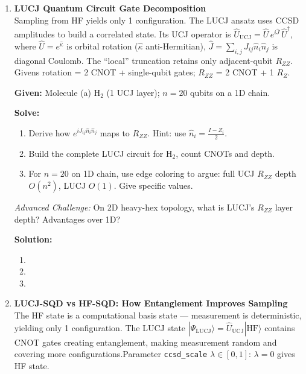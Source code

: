 \documentclass[fontset=mac]{ctexart}
\newcommand{\ket}[1]{|#1\rangle}
\begin{document}
\begin{enumerate}
    \emph{Advanced Challenge:} Formulate as Bayesian inference --- $\bar{n}_i$ as prior, observed bitstring as likelihood, find MAP configuration. How does this relate to (b)?

    \textbf{Solution:}
    \begin{enumerate}[label=(\alph*)]
        \item
        \item
        \item
    \end{enumerate}

    \item \textbf{LUCJ Quantum Circuit Gate Decomposition} \\ Sampling from HF yields only 1 configuration. The LUCJ ansatz uses CCSD amplitudes to build a correlated state. Its UCJ operator is $\hat{U}_{\text{UCJ}} = \hat{U}\, e^{i\hat{J}}\, \hat{U}^\dagger$, where $\hat{U} = e^{\hat{\kappa}}$ is orbital rotation ($\hat{\kappa}$ anti-Hermitian), $\hat{J} = \sum_{i,j} J_{ij}\hat{n}_i\hat{n}_j$ is diagonal Coulomb. The ``local'' truncation retains only adjacent-qubit $R_{ZZ}$. Givens rotation = 2 CNOT + single-qubit gates; $R_{ZZ}$ = 2 CNOT + 1 $R_Z$.

    \textbf{Given:} Molecule (a) H$_2$ (1 UCJ layer); $n{=}20$ qubits on a 1D chain.

    \textbf{Solve:}
    \begin{enumerate}[label=(\alph*)]
        \item Derive how $e^{iJ_{ij}\hat{n}_i\hat{n}_j}$ maps to $R_{ZZ}$. Hint: use $\hat{n}_i = \frac{I-Z_i}{2}$.
        \item Build the complete LUCJ circuit for H$_2$, count CNOTs and depth.
        \item For $n{=}20$ on 1D chain, use edge coloring to argue: full UCJ $R_{ZZ}$ depth $O(n^2)$, LUCJ $O(1)$. Give specific values.
    \end{enumerate}

    \emph{Advanced Challenge:} On 2D heavy-hex topology, what is LUCJ's $R_{ZZ}$ layer depth? Advantages over 1D?

    \textbf{Solution:}
    \begin{enumerate}[label=(\alph*)]
        \item
        \item
        \item
    \end{enumerate}

    \item \textbf{LUCJ-SQD vs HF-SQD: How Entanglement Improves Sampling} \\ The HF state is a computational basis state --- measurement is deterministic, yielding only 1 configuration. The LUCJ state $\ket{\Psi_{\text{LUCJ}}} = \hat{U}_{\text{UCJ}}\ket{\text{HF}}$ contains CNOT gates creating entanglement, making measurement random and covering more configurations.Parameter \texttt{ccsd\_scale} $\lambda\in[0,1]$: $\lambda{=}0$ gives HF state.


\end{enumerate}
\end{document}
